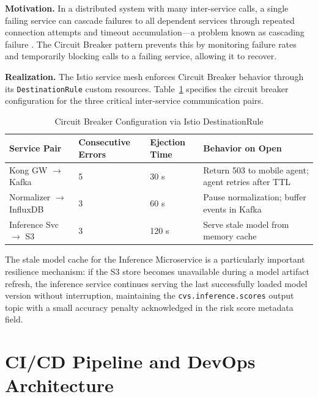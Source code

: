 \documentclass[conference]{IEEEtran}
\begin{document}
\textbf{Motivation.} In a distributed system with many inter-service calls, a single
failing service can cascade failures to all dependent services through repeated
connection attempts and timeout accumulation---a problem known as cascading failure
\cite{b29}. The Circuit Breaker pattern prevents this by monitoring failure rates and
temporarily blocking calls to a failing service, allowing it to recover.

\textbf{Realization.} The Istio service mesh enforces Circuit Breaker behavior through
its \texttt{DestinationRule} custom resources. Table~\ref{tab:circuitbreaker} specifies
the circuit breaker configuration for the three critical inter-service communication
pairs.

\begin{table}[H]
  \centering
  \caption{Circuit Breaker Configuration via Istio DestinationRule}
  \label{tab:circuitbreaker}
  \begin{tabularx}{\textwidth}{p{4cm} p{2.5cm} p{2.5cm} X}
    \toprule
    \textbf{Service Pair} & \textbf{Consecutive Errors} & \textbf{Ejection Time} &
    \textbf{Behavior on Open} \\
    \midrule
    Kong GW $\rightarrow$ Kafka & 5 & 30 s & Return 503 to mobile agent; agent retries after TTL \\
    Normalizer $\rightarrow$ InfluxDB & 3 & 60 s & Pause normalization; buffer events in Kafka \\
    Inference Svc $\rightarrow$ S3 & 3 & 120 s & Serve stale model from memory cache \\
    \bottomrule
  \end{tabularx}
\end{table}

The stale model cache for the Inference Microservice is a particularly important
resilience mechanism: if the S3 store becomes unavailable during a model artifact
refresh, the inference service continues serving the last successfully loaded model
version without interruption, maintaining the \texttt{cvs.inference.scores} output
topic with a small accuracy penalty acknowledged in the risk score metadata field.

\section{CI/CD Pipeline and DevOps Architecture}
\end{document}
